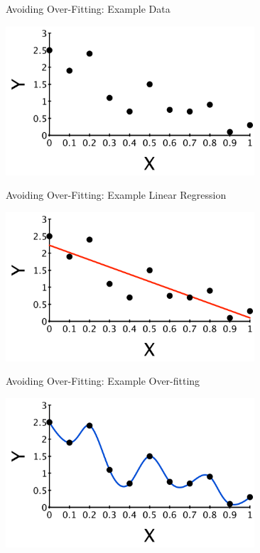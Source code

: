 \documentclass[aspectratio=169]{beamer}
\begin{document}

\begin{frame}{Avoiding Over-Fitting: Example Data}

\vspace{1em}
\includegraphics[height=15em]{./lectReg/overfitEx1.pdf}
\end{frame}


\begin{frame}{Avoiding Over-Fitting: Example Linear Regression}

\vspace{1em}
\includegraphics[height=15em]{./lectReg/overfitEx2.pdf}
\end{frame}


\begin{frame}{Avoiding Over-Fitting: Example Over-fitting}

\vspace{1em}
\includegraphics[height=15em]{./lectReg/overfitEx3.pdf}

\end{frame}
\end{document}
